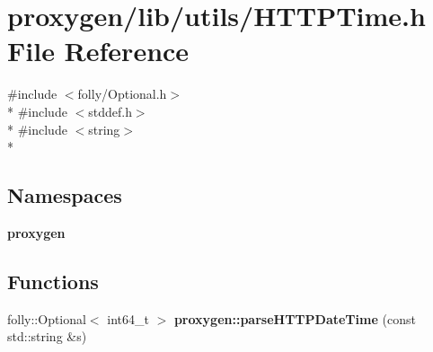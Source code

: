 \section{proxygen/lib/utils/\+H\+T\+T\+P\+Time.h File Reference}
\label{HTTPTime_8h}
{\ttfamily \#include $<$folly/\+Optional.\+h$>$}\\*
{\ttfamily \#include $<$stddef.\+h$>$}\\*
{\ttfamily \#include $<$string$>$}\\*
\subsection*{Namespaces}
\begin{DoxyCompactItemize}
\item 
 {\bf proxygen}
\end{DoxyCompactItemize}
\subsection*{Functions}
\begin{DoxyCompactItemize}
\item 
folly\+::\+Optional$<$ int64\+\_\+t $>$ {\bf proxygen\+::parse\+H\+T\+T\+P\+Date\+Time} (const std\+::string \&s)
\end{DoxyCompactItemize}

